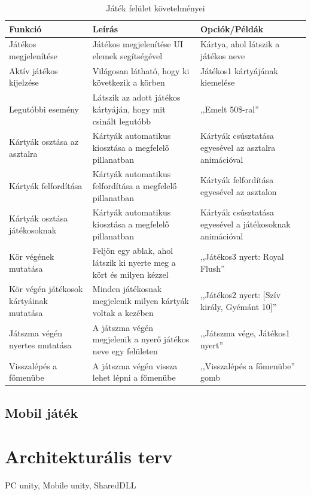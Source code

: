 \documentclass[]{thesis-ekf}
\theoremstyle{definition}
\theoremstyle{remark}
\begin{document}
\begin{table}[ht!]
	\centering
	\footnotesize
	\begin{tabular}{|p{4cm}|p{7cm}|p{4cm}|}
		\hline
		\textbf{Funkció} & \textbf{Leírás} & \textbf{Opciók/Példák} \\ 
		\hline
		Játékos megjelenítése & Játékos megjelenítése UI elemek segítségével & Kártya, ahol látszik a játékos neve \\
		\hline
		Aktív játékos kijelzése & Világosan látható, hogy ki következik a körben & Játékos1 kártyájának kiemelése \\ 
		\hline
		Legutóbbi esemény & Látszik az adott játékos kártyáján, hogy mit csinált legutóbb & ,,Emelt 50\$-ral'' \\
		\hline
		Kártyák osztása az asztalra & Kártyák automatikus kiosztása a megfelelő pillanatban & Kártyák csúsztatása egyesével az asztalra animációval \\ 
		\hline
		Kártyák felfordítása & Kártyák automatikus felfordítása a megfelelő pillanatban & Kártyák felfordítása egyesével az asztalon \\ 
		\hline
		Kártyák osztása játékosoknak & Kártyák automatikus kiosztása a megfelelő pillanatban & Kártyák csúsztatása egyesével a játékosoknak animációval \\ 
		\hline
		Kör végének mutatása & Feljön egy ablak, ahol látszik ki nyerte meg a kört és milyen kézzel & ,,Játékos3 nyert: Royal Flush'' \\
		\hline
		Kör végén játékosok kártyáinak mutatása & Minden játékosnak megjelenik milyen kártyák voltak a kezében & ,,Játékos2 nyert: [Szív király, Gyémánt 10]'' \\
		\hline
		Játszma végén nyertes mutatása & A játszma végén megjelenik a nyerő játékos neve egy felületen & ,,Játszma vége, Játékos1 nyert'' \\
		\hline
		Visszalépés a főmenübe & A játszma végén vissza lehet lépni a főmenübe & ,,Visszalépés a főmenübe'' gomb \\
		\hline
	\end{tabular}
	\caption{Játék felület követelményei}
\end{table}


\subsection{Mobil játék}

\section{Architekturális terv}
\label{sec-architecture}
PC unity, Mobile unity, SharedDLL
\end{document}
